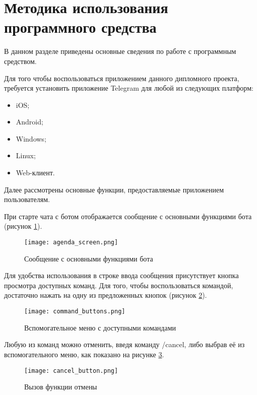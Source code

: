 \section{Методика использования программного средства}
\label{sec:manual}

В данном разделе приведены основные сведения по работе с программным средством.

Для того чтобы воспользоваться приложением данного дипломного проекта, требуется установить приложение Telegram для любой из следующих платформ:

\begin{itemize}
	\item iOS;
	\item Android;
	\item Windows;
	\item Linux;
	\item Web-клиент.
\end{itemize}

Далее рассмотрены основные функции, предоставляемые приложением пользователям.

При старте чата с ботом отображается сообщение с основными функциями бота (рисунок \ref{fig:manual:agenda_screen}).

\begin{figure}[ht]
\centering
	\texttt{[image: agenda\_screen.png]}
	\caption{Сообщение с основными функциями бота}
	\label{fig:manual:agenda_screen}
\end{figure}

Для удобства использования в строке ввода сообщения присутствует кнопка просмотра доступных команд. Для того, чтобы воспользоваться командой, достаточно нажать на одну из предложенных кнопок (рисунок \ref{fig:manual:command_buttons}).

\begin{figure}[ht]
\centering
	\texttt{[image: command\_buttons.png]}
	\caption{Вспомогательное меню с доступными командами}
	\label{fig:manual:command_buttons}
\end{figure}

Любую из команд можно отменить, введя команду /cancel, либо выбрав её из вспомогательного меню, как показано на рисунке \ref{fig:manual:cancel_button}. 

\begin{figure}[ht]
\centering
	\texttt{[image: cancel\_button.png]}
	\caption{Вызов функции отмены}
	\label{fig:manual:cancel_button}
\end{figure}

